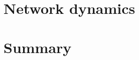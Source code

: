 \documentclass[12pt, twoside]{report}
\begin{document}
    

    \chapter{Network dynamics}

    

    

    

    \chapter{Summary}


\printbibliography[title={References}]
\end{document}
